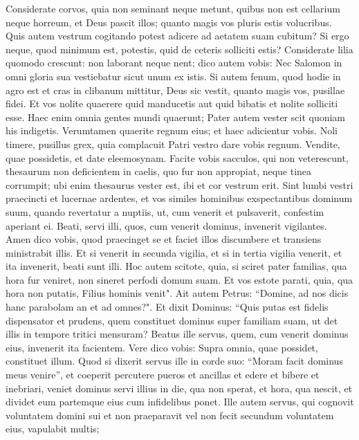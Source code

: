 \begin{biblechapter}
\verse Considerate corvos, quia non seminant neque metunt, quibus non est cellarium neque horreum, et Deus pascit illos; quanto magis vos pluris estis volucribus. 
\verse Quis autem vestrum cogitando potest adicere ad aetatem suam cubitum? 
\verse Si ergo neque, quod minimum est, potestis, quid de ceteris solliciti estis? 
\verse Considerate lilia quomodo crescunt: non laborant neque nent; dico autem vobis: Nec Salomon in omni gloria sua vestiebatur sicut unum ex istis. 
\verse Si autem fenum, quod hodie in agro est et cras in clibanum mittitur, Deus sic vestit, quanto magis vos, pusillae fidei. 
\verse Et vos nolite quaerere quid manducetis aut quid bibatis et nolite solliciti esse. 
\verse Haec enim omnia gentes mundi quaerunt; Pater autem vester scit quoniam his indigetis. 
\verse Verumtamen quaerite regnum eius; et haec adicientur vobis. 
\verse Noli timere, pusillus grex, quia complacuit Patri vestro dare vobis regnum. 
\verse Vendite, quae possidetis, et date eleemosynam. Facite vobis sacculos, qui non veterescunt, thesaurum non deficientem in caelis, quo fur non appropiat, neque tinea corrumpit; 
\verse ubi enim thesaurus vester est, ibi et cor vestrum erit. 
\verse Sint lumbi vestri praecincti et lucernae ardentes, 
\verse et vos similes hominibus exspectantibus dominum suum, quando revertatur a nuptiis, ut, cum venerit et pulsaverit, confestim aperiant ei. 
\verse Beati, servi illi, quos, cum venerit dominus, invenerit vigilantes. Amen dico vobis, quod praecinget se et faciet illos discumbere et transiens ministrabit illis. 
\verse Et si venerit in secunda vigilia, et si in tertia vigilia venerit, et ita invenerit, beati sunt illi. 
\verse Hoc autem scitote, quia, si sciret pater familias, qua hora fur veniret, non sineret perfodi domum suam. 
\verse Et vos estote parati, quia, qua hora non putatis, Filius hominis venit". 
\verse Ait autem Petrus: “Domine, ad nos dicis hanc parabolam an et ad omnes?". 
\verse Et dixit Dominus: “Quis putas est fidelis dispensator et prudens, quem constituet dominus super familiam suam, ut det illis in tempore tritici mensuram? 
\verse Beatus ille servus, quem, cum venerit dominus eius, invenerit ita facientem. 
\verse Vere dico vobis: Supra omnia, quae possidet, constituet illum. 
\verse Quod si dixerit servus ille in corde suo: “Moram facit dominus meus venire”, et coeperit percutere pueros et ancillas et edere et bibere et inebriari, 
\verse veniet dominus servi illius in die, qua non sperat, et hora, qua nescit, et dividet eum partemque eius cum infidelibus ponet. 
\verse Ille autem servus, qui cognovit voluntatem domini sui et non praeparavit vel non fecit secundum voluntatem eius, vapulabit multis; 

\end{biblechapter}
